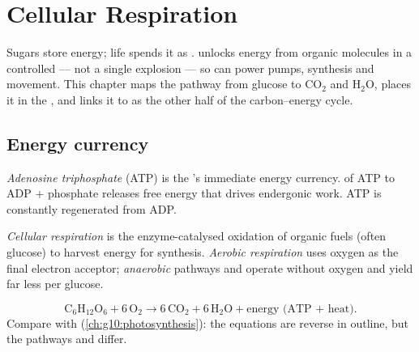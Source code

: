 \chapter{Cellular Respiration}\label{ch:g10:cellular-respiration}

Sugars store energy; life spends it as .  unlocks
energy from organic molecules in a controlled  --- not a single
explosion --- so  can power pumps, synthesis and movement. This
chapter maps the pathway from glucose to $\mathrm{CO_2}$ and
$\mathrm{H_2O}$, places it in the , and links it to
 as the other half of the carbon--energy cycle.

\section{Energy currency}

\begin{definition}[ATP]\label{def:g10:cellular-respiration:ATP}
\emph{Adenosine triphosphate} (ATP) is the 's immediate
energy currency.  of ATP to ADP + phosphate releases free
energy that drives endergonic work. ATP is constantly regenerated from
ADP.
\end{definition}

\begin{definition}\label{def:g10:cellular-respiration:def}
\emph{Cellular respiration} is the
enzyme-catalysed oxidation of organic fuels (often glucose) to harvest
energy for  synthesis. \emph{Aerobic respiration} uses oxygen as the final electron acceptor;
\emph{anaerobic} pathways and 
operate without oxygen and yield far less  per glucose.
\end{definition}

\begin{proposition}\label{prop:g10:cellular-respiration:equation}
\[
\mathrm{C_6H_{12}O_6} + 6\,\mathrm{O_2}
\to
6\,\mathrm{CO_2} + 6\,\mathrm{H_2O} + \text{energy (ATP + heat)}.
\]
Compare with  (\cref{ch:g10:photosynthesis}): the equations
are reverse in outline, but the pathways and  differ.
\end{proposition}
\admitted

